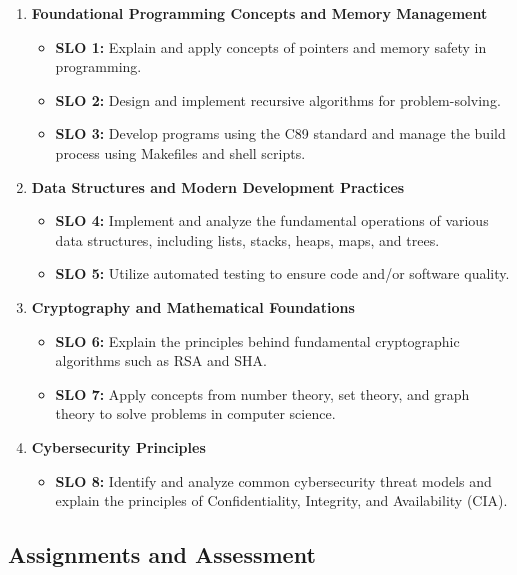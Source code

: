 \documentclass[11pt]{article}
\begin{document}
\begin{enumerate}
    \item \textbf{Foundational Programming Concepts and Memory Management}
        \begin{itemize}
            \item \textbf{SLO 1:} Explain and apply concepts of pointers and memory safety in programming.
            \item \textbf{SLO 2:} Design and implement recursive algorithms for problem-solving.
            \item \textbf{SLO 3:} Develop programs using the C89 standard and manage the build process using Makefiles and shell scripts.
        \end{itemize}
    \item \textbf{Data Structures and Modern Development Practices}
        \begin{itemize}
            \item \textbf{SLO 4:} Implement and analyze the fundamental operations of various data structures, including lists, stacks, heaps, maps, and trees.
            \item \textbf{SLO 5:} Utilize automated testing to ensure code and/or software quality.
        \end{itemize}
    \item \textbf{Cryptography and Mathematical Foundations}
        \begin{itemize}
            \item \textbf{SLO 6:} Explain the principles behind fundamental cryptographic algorithms such as RSA and SHA.
            \item \textbf{SLO 7:} Apply concepts from number theory, set theory, and graph theory to solve problems in computer science.
        \end{itemize}
    \item \textbf{Cybersecurity Principles}
        \begin{itemize}
            \item \textbf{SLO 8:} Identify and analyze common cybersecurity threat models and explain the principles of Confidentiality, Integrity, and Availability (CIA).
        \end{itemize}
\end{enumerate}


\subsection*{Assignments and Assessment}
\end{document}
